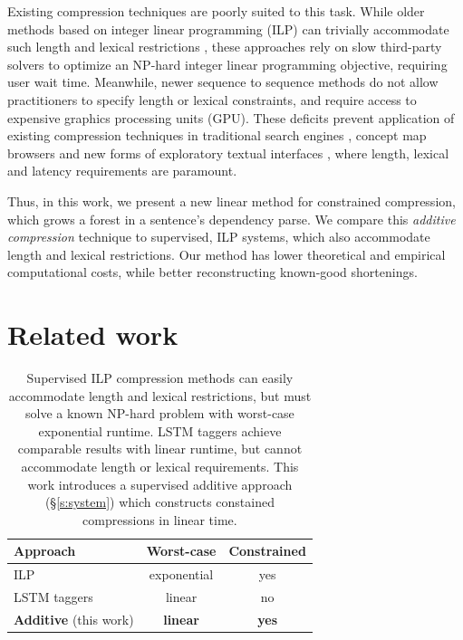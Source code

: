 \documentclass[11pt,a4paper]{article}
\begin{document}
Existing compression techniques are poorly suited to this task. While older methods based on integer linear programming (ILP) can trivially accommodate such length and lexical restrictions \cite{clarke2008global,filippova2013overcoming}, these approaches rely on slow third-party solvers to optimize an NP-hard integer linear programming objective\label{s:relatedwork}, requiring user wait time. Meanwhile, newer sequence to sequence methods \cite{filippova2015sentence} do not allow practitioners to specify length or lexical constraints, and require access to expensive graphics processing units (GPU). These deficits prevent application of existing compression techniques in traditional search engines \cite{hearst2009search}, concept map browsers \cite{falke2017graphdocexplore} and new forms of exploratory textual interfaces \cite{marchionini2006exploratory}, where length, lexical and latency requirements are paramount. 

Thus, in this work, we present a new linear method for constrained compression, which grows a forest in a sentence's dependency parse. We compare this \textit{additive compression} technique to supervised, ILP systems, which also accommodate length and lexical restrictions. Our method has lower theoretical and empirical computational costs, while better reconstructing known-good shortenings. 

\section{Related work}\label{s:relatedwork}


\begin{table}[htb!]
\begin{tabular}{lcc}
\textbf{Approach} & \textbf{Worst-case} & \textbf{Constrained}  \\ \hline
ILP       &   exponential    & yes     \\
LSTM taggers   & linear              & no         \\   
\textbf{Additive} {\small (this work)}  & \textbf{linear}     &      \textbf{yes}   
\end{tabular}
\caption{Supervised ILP compression methods \cite{clarke2008global,filippova2013overcoming,Wang2017CanSH} can easily accommodate length and lexical restrictions, but must solve a known NP-hard problem with worst-case exponential runtime. LSTM taggers \cite{filippova2015sentence} achieve comparable results with linear runtime, but cannot accommodate length or lexical requirements. This work introduces a supervised additive approach (\S\ref{s:system}) which constructs constained compressions in linear time.} 
\label{t:algos}
\end{table}
\end{document}
